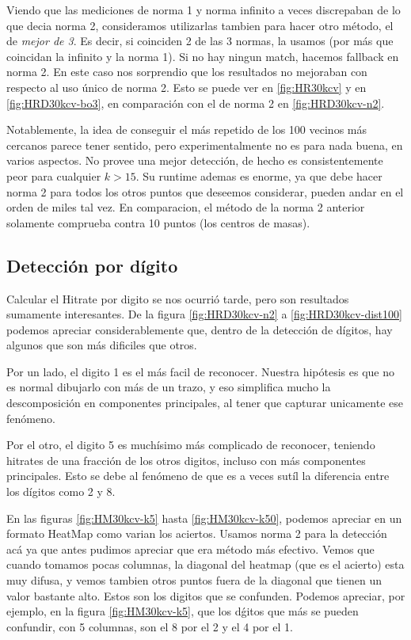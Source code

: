 Viendo que las mediciones de norma 1 y norma infinito a veces discrepaban de lo que
decia norma 2, consideramos utilizarlas tambien para hacer otro m\'etodo, el de \textit{mejor
de 3}. Es decir, si coinciden 2 de las 3 normas, la usamos (por m\'as que coincidan la
infinito y la norma 1). Si no hay ningun match, hacemos fallback en norma 2. En este caso
nos sorprendio que los resultados no mejoraban con respecto al uso \'unico de norma 2.
Esto se puede ver en \ref{fig:HR30kcv} y en \ref{fig:HRD30kcv-bo3}, en comparaci\'on con
el de norma 2 en \ref{fig:HRD30kcv-n2}.

Notablemente, la idea de conseguir el m\'as repetido de los 100 vecinos m\'as cercanos
parece tener sentido, pero experimentalmente no es para nada buena, en varios aspectos.
No provee una mejor detecci\'on, de hecho es consistentemente peor para cualquier $k>15$.
Su runtime ademas es enorme, ya que debe hacer norma 2 para todos los otros puntos que
deseemos considerar, pueden andar en el orden de miles tal vez. En comparacion, el m\'etodo
de la norma 2 anterior solamente comprueba contra 10 puntos (los centros de masas).


\subsection{Detecci\'on por d\'igito}
Calcular el Hitrate por digito se nos ocurri\'o tarde, pero son resultados
sumamente interesantes. De la figura \ref{fig:HRD30kcv-n2} a \ref{fig:HRD30kcv-dist100}
podemos apreciar considerablemente que, dentro de
la detecci\'on de d\'igitos, hay algunos que son m\'as dificiles que otros.

Por un lado, el digito 1 es el m\'as facil de reconocer. Nuestra hip\'otesis
es que no es normal dibujarlo con m\'as de un trazo, y eso simplifica mucho la
descomposici\'on en componentes principales, al tener que capturar unicamente ese
fen\'omeno.

Por el otro, el digito 5 es much\'isimo m\'as complicado de reconocer, teniendo
hitrates de una fracci\'on de los otros digitos, incluso con m\'as componentes
principales. Esto se debe al fen\'omeno de que es a veces sut\'il la diferencia
entre los d\'igitos como 2 y 8.

En las figuras \ref{fig:HM30kcv-k5} hasta \ref{fig:HM30kcv-k50}, podemos apreciar
en un formato HeatMap como varian los aciertos. Usamos norma 2 para la detecci\'on ac\'a
ya que antes pudimos apreciar que era m\'etodo m\'as efectivo. Vemos que cuando tomamos pocas
columnas, la diagonal del heatmap (que es el acierto) esta muy difusa, y vemos tambien
otros puntos fuera de la diagonal que tienen un valor bastante alto. Estos son los digitos
que se confunden. Podemos apreciar, por ejemplo, en la figura \ref{fig:HM30kcv-k5}, que
los d\'gitos que m\'as se pueden confundir, con 5 columnas, son el 8 por el 2 y el 4 por el 1.

